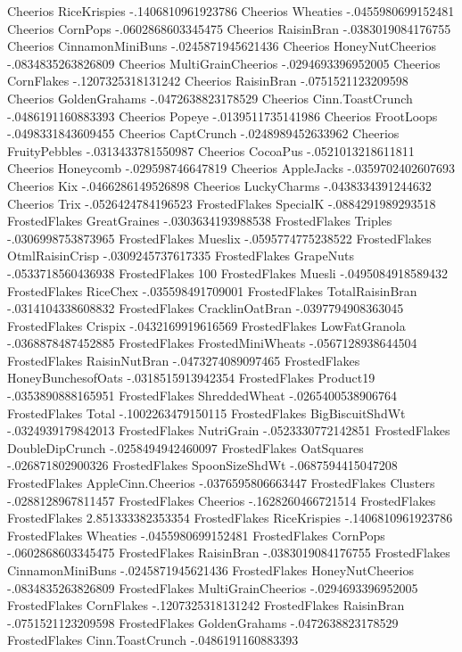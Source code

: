 Cheerios	RiceKrispies	-.1406810961923786
Cheerios	Wheaties	-.0455980699152481
Cheerios	CornPops	-.0602868603345475
Cheerios	RaisinBran	-.0383019084176755
Cheerios	CinnamonMiniBuns	-.0245871945621436
Cheerios	HoneyNutCheerios	-.0834835263826809
Cheerios	MultiGrainCheerios	-.0294693396952005
Cheerios	CornFlakes	-.1207325318131242
Cheerios	RaisinBran	-.0751521123209598
Cheerios	GoldenGrahams	-.0472638823178529
Cheerios	Cinn.ToastCrunch	-.0486191160883393
Cheerios	Popeye	-.0139511735141986
Cheerios	FrootLoops	-.0498331843609455
Cheerios	CaptCrunch	-.0248989452633962
Cheerios	FruityPebbles	-.0313433781550987
Cheerios	CocoaPus	-.0521013218611811
Cheerios	Honeycomb	-.029598746647819
Cheerios	AppleJacks	-.0359702402607693
Cheerios	Kix	-.0466286149526898
Cheerios	LuckyCharms	-.0438334391244632
Cheerios	Trix	-.0526424784196523
FrostedFlakes	SpecialK	-.0884291989293518
FrostedFlakes	GreatGraines	-.0303634193988538
FrostedFlakes	Triples	-.0306998753873965
FrostedFlakes	Mueslix	-.0595774775238522
FrostedFlakes	OtmlRaisinCrisp	-.0309245737617335
FrostedFlakes	GrapeNuts	-.0533718560436938
FrostedFlakes	100%
FrostedFlakes	Muesli	-.0495084918589432
FrostedFlakes	RiceChex	-.035598491709001
FrostedFlakes	TotalRaisinBran	-.0314104338608832
FrostedFlakes	CracklinOatBran	-.0397794908363045
FrostedFlakes	Crispix	-.0432169919616569
FrostedFlakes	LowFatGranola	-.0368878487452885
FrostedFlakes	FrostedMiniWheats	-.0567128938644504
FrostedFlakes	RaisinNutBran	-.0473274089097465
FrostedFlakes	HoneyBunchesofOats	-.0318515913942354
FrostedFlakes	Product19	-.0353890888165951
FrostedFlakes	ShreddedWheat	-.0265400538906764
FrostedFlakes	Total	-.1002263479150115
FrostedFlakes	BigBiscuitShdWt	-.0324939179842013
FrostedFlakes	NutriGrain	-.0523330772142851
FrostedFlakes	DoubleDipCrunch	-.0258494942460097
FrostedFlakes	OatSquares	-.026871802900326
FrostedFlakes	SpoonSizeShdWt	-.0687594415047208
FrostedFlakes	AppleCinn.Cheerios	-.0376595806663447
FrostedFlakes	Clusters	-.0288128967811457
FrostedFlakes	Cheerios	-.1628260466721514
FrostedFlakes	FrostedFlakes	2.851333382353354
FrostedFlakes	RiceKrispies	-.1406810961923786
FrostedFlakes	Wheaties	-.0455980699152481
FrostedFlakes	CornPops	-.0602868603345475
FrostedFlakes	RaisinBran	-.0383019084176755
FrostedFlakes	CinnamonMiniBuns	-.0245871945621436
FrostedFlakes	HoneyNutCheerios	-.0834835263826809
FrostedFlakes	MultiGrainCheerios	-.0294693396952005
FrostedFlakes	CornFlakes	-.1207325318131242
FrostedFlakes	RaisinBran	-.0751521123209598
FrostedFlakes	GoldenGrahams	-.0472638823178529
FrostedFlakes	Cinn.ToastCrunch	-.0486191160883393
